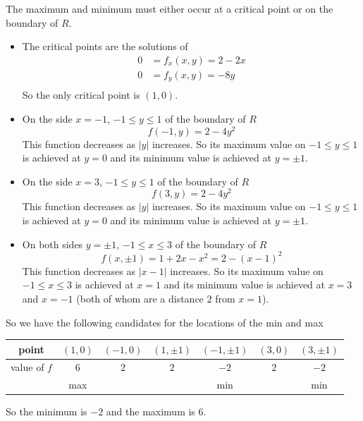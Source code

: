 \begin{solution}
The maximum and minimum must either occur at a critical point or on
the boundary of $R$.
\begin{itemize}
\item 
The critical points are the solutions of
\begin{align*}
0&=f_x(x,y) = 2-2x \\
0&=f_y(x,y) = -8y \\ 
\end{align*} 
So the only critical point is $(1,0)$.
\item
On the side $x=-1$, $-1\le y\le 1$ of the boundary of $R$
\begin{equation*}
f(-1,y) = 2-4y^2 
\end{equation*}
This function decreases as $|y|$ increases. So its maximum value
on $-1\le y\le 1$ is achieved at $y=0$ and its minimum value is achieved
at $y=\pm 1$.

\item
On the side $x=3$, $-1\le y\le 1$ of the boundary of $R$
\begin{equation*}
f(3,y) = 2-4y^2 
\end{equation*}
This function decreases as $|y|$ increases. So its maximum value
on $-1\le y\le 1$ is achieved at $y=0$ and its minimum value is achieved
at $y=\pm 1$.

\item
On both sides $y=\pm 1$, $-1\le x\le 3$ of the boundary of $R$
\begin{equation*}
f(x,\pm 1) = 1+2x-x^2 = 2 -(x-1)^2 
\end{equation*}
This function decreases as $|x-1|$ increases. So its maximum value
on $-1\le x\le 3$ is achieved at $x=1$ and its minimum value is achieved
at $x= 3$ and $x=-1$ (both of whom are a distance $2$ from $x=1$).

\end{itemize}
So we have the following candidates for the locations of the min and max
\begin{center}
\renewcommand{\arraystretch}{1.3}
     \begin{tabular}{|c|c|c|c|c|c|c|}
     \hline
       point
       &$(1,0)$
       &$(-1,0)$ 
       &$(1,\pm 1)$ 
       &$(-1,\pm 1)$ 
       &$(3,0)$ 
       &$(3,\pm 1)$ \\ \hline
       value of $f$
       &$6$
       &$2$
       &$2$
       &$-2$
       &$2$
       &$-2$ \\ \hline
       &max 
       &    
       &  
       &min  
       &  
       &min \\ \hline
     \end{tabular}
\renewcommand{\arraystretch}{1.0}
\end{center}
So the minimum is $-2$ and the maximum is $6$.
\end{solution}

